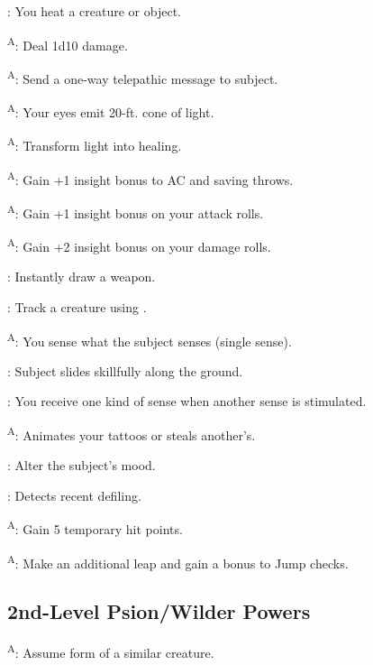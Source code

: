 : You heat a creature or object.

\textsuperscript{A}: Deal 1d10 damage.

\textsuperscript{A}: Send a one-way telepathic message to subject.

\textsuperscript{A}: Your eyes emit 20-ft. cone of light.

\textsuperscript{A}: Transform light into healing.

\textsuperscript{A}: Gain +1 insight bonus to AC and saving throws.

\textsuperscript{A}: Gain +1 insight bonus on your attack rolls.

\textsuperscript{A}: Gain +2 insight bonus on your damage rolls.

: Instantly draw a weapon.

: Track a creature using .

\textsuperscript{A}: You sense what the subject senses (single sense).

: Subject slides skillfully along the ground.

: You receive one kind of sense when another sense is stimulated.

\textsuperscript{A}: Animates your tattoos or steals another’s.

: Alter the subject’s mood.

: Detects recent defiling.

\textsuperscript{A}: Gain 5 temporary hit points.

\textsuperscript{A}: Make an additional leap and gain a bonus to Jump checks.




\subsection{2nd-Level Psion/Wilder Powers}

\textsuperscript{A}: Assume form of a similar creature.

